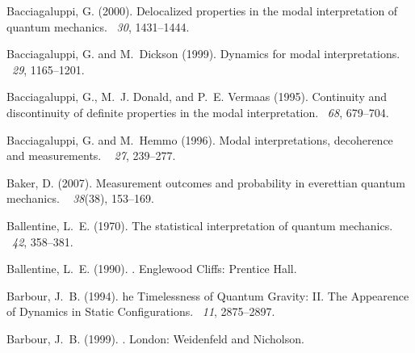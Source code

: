 \documentclass[12pt]{article}
\begin{document}
\begin{thebibliography}{}
Bacciagaluppi, G. (2000).
\newblock Delocalized properties in the modal interpretation of quantum
  mechanics.
~{\em 30}, 1431--1444.

Bacciagaluppi, G. and M.~Dickson (1999).
\newblock Dynamics for modal interpretations.
~{\em 29}, 1165--1201.

Bacciagaluppi, G., M.~J. Donald, and P.~E. Vermaas (1995).
\newblock Continuity and discontinuity of definite properties in the modal
  interpretation.
~{\em 68}, 679--704.

Bacciagaluppi, G. and M.~Hemmo (1996).
\newblock Modal interpretations, decoherence and measurements.
~{\em
  27}, 239--277.

Baker, D. (2007).
\newblock Measurement outcomes and probability in everettian quantum mechanics.
~{\em
  38\/}(38), 153--169.

Ballentine, L.~E. (1970).
\newblock The statistical interpretation of quantum mechanics.
~{\em 42}, 358--381.

Ballentine, L.~E. (1990).
.
\newblock Englewood Cliffs: Prentice Hall.

Barbour, J.~B. (1994).
he {T}imelessness of {Q}uantum {G}ravity: {II}. {T}he {A}ppearence
  of {D}ynamics in {S}tatic {C}onfigurations.
~{\em 11}, 2875--2897.

Barbour, J.~B. (1999).
.
\newblock London: Weidenfeld and Nicholson.


\end{thebibliography}
\end{document}

